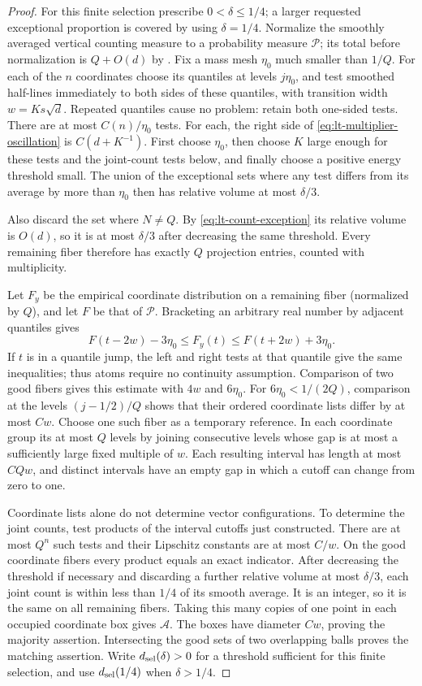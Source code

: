 \begin{proof}
For this finite selection prescribe $0<\delta\le1/4$; a larger requested
exceptional proportion is covered by using $\delta=1/4$.
Normalize the smoothly averaged vertical counting measure to a probability
measure $\mathcal P$; its total before normalization is $Q+O(d)$ by
.  Fix a mass mesh $\eta_0$ much smaller than $1/Q$.
For each of the $n$ coordinates choose its quantiles at levels
$j\eta_0$, and test smoothed half-lines immediately to both sides of these
quantiles, with transition width
$w=K s\sqrt d$.  Repeated quantiles cause no problem: retain both one-sided
tests.  There are at most $C(n)/\eta_0$ tests.  For each, the right side of
\eqref{eq:lt-multiplier-oscillation} is $C(d+K^{-1})$.
First choose $\eta_0$, then choose $K$ large enough for these tests and the
joint-count tests below, and finally choose a positive energy threshold small.
The union of the exceptional sets where any test differs from its average
by more than $\eta_0$ then has relative volume at most $\delta/3$.

Also discard the set where $N\ne Q$.  By \eqref{eq:lt-count-exception}
its relative volume is $O(d)$, so it is at most $\delta/3$ after decreasing
the same threshold.  Every remaining fiber therefore has exactly $Q$
projection entries, counted with multiplicity.

Let $F_y$ be the empirical coordinate distribution on a remaining fiber
(normalized by $Q$), and let $F$ be that of $\mathcal P$.  Bracketing an
arbitrary real number by adjacent quantiles gives
\[
 F(t-2w)-3\eta_0\le F_y(t)\le F(t+2w)+3\eta_0.
\]
If $t$ is in a quantile jump, the left and right tests at that quantile give
the same inequalities; thus atoms require no continuity assumption.
Comparison of two good fibers gives this estimate with $4w$ and
$6\eta_0$.  For $6\eta_0<1/(2Q)$, comparison at the levels
$(j-1/2)/Q$ shows that their ordered coordinate lists differ by at most
$Cw$.  Choose one such fiber as a temporary reference.  In each coordinate
group its at most $Q$ levels by joining consecutive levels whose gap is at
most a sufficiently large fixed multiple of $w$.  Each resulting interval
has length at most $CQw$, and distinct intervals have an empty gap in which
a cutoff can change from zero to one.

Coordinate lists alone do not determine vector configurations.  To determine
the joint counts, test products of the interval cutoffs just constructed.
There are at most $Q^n$ such tests and their Lipschitz constants are at most
$C/w$.  On the good coordinate fibers every product equals an exact
indicator.  After decreasing the threshold if necessary and discarding a
further relative volume at most $\delta/3$, each
joint count is within less than $1/4$ of its smooth average.  It is an
integer, so it is the same on all remaining fibers.  Taking this many
copies of one point in each occupied coordinate box gives $\mathcal A$.
The boxes have diameter $Cw$, proving the majority assertion.  Intersecting
the good sets of two overlapping balls proves the matching assertion.
Write $d_{\rm sel}(\delta)>0$ for a threshold sufficient for this finite
selection, and use $d_{\rm sel}(1/4)$ when $\delta>1/4$.


\end{proof}
